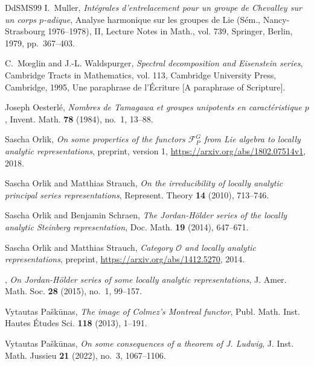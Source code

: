 \documentclass[a4paper]{amsart}
\numberwithin{equation}{section}
\theoremstyle{remark}
\theoremstyle{definition}
\begin{document}
\begin{thebibliography}{DdSMS99}
I.~Muller, \emph{Int\'{e}grales d'entrelacement pour un groupe de {C}hevalley
  sur un corps {$p$}-adique}, Analyse harmonique sur les groupes de {L}ie
  ({S}\'{e}m., {N}ancy-{S}trasbourg 1976--1978), {II}, Lecture Notes in Math.,
  vol. 739, Springer, Berlin, 1979, pp.~367--403. 

C.~M{\oe}glin and J.-L. Waldspurger, \emph{Spectral decomposition and
  {E}isenstein series}, Cambridge Tracts in Mathematics, vol. 113, Cambridge
  University Press, Cambridge, 1995, Une paraphrase de l'\'Ecriture [A
  paraphrase of Scripture]. 

Joseph Oesterl\'{e}, \emph{Nombres de {T}amagawa et groupes unipotents en
  caract\'{e}ristique {$p$}}, Invent. Math. \textbf{78} (1984), no.~1, 13--88.

Sascha Orlik, \emph{On some properties of the functors {${\mathcal F}^G_P$}
  from {L}ie algebra to locally analytic representations}, preprint, version 1,
  \url{https://arxiv.org/abs/1802.07514v1}, 2018.

Sascha Orlik and Matthias Strauch, \emph{On the irreducibility of locally
  analytic principal series representations}, Represent. Theory \textbf{14}
  (2010), 713--746. 

Sascha Orlik and Benjamin Schraen, \emph{The {J}ordan-{H}\"{o}lder series of
  the locally analytic {S}teinberg representation}, Doc. Math. \textbf{19}
  (2014), 647--671. 

Sascha Orlik and Matthias Strauch, \emph{Category {$\mathcal O$} and locally
  analytic representations}, preprint, \url{https://arxiv.org/abs/1412.5270},
  2014.

\bysame, \emph{On {J}ordan-{H}\"older series of some locally analytic
  representations}, J. Amer. Math. Soc. \textbf{28} (2015), no.~1, 99--157.

Vytautas Pa{\v{s}}k{\={u}}nas, \emph{The image of {C}olmez's {M}ontreal
  functor}, Publ. Math. Inst. Hautes \'{E}tudes Sci. \textbf{118} (2013),
  1--191. 

Vytautas Pa{\v{s}}k\={u}nas, \emph{On some consequences of a theorem of {J}.
  {L}udwig}, J. Inst. Math. Jussieu \textbf{21} (2022), no.~3, 1067--1106.


\end{thebibliography}
\end{document}
